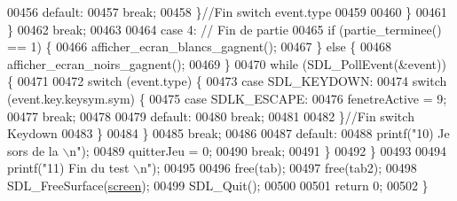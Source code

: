 \begin{DoxyCode}
00456                                         \textcolor{keywordflow}{default}:
00457                                                 \textcolor{keywordflow}{break};
00458                                         \}\textcolor{comment}{//Fin switch event.type}
00459 
00460                                 \}
00461                         \}
00462                         \textcolor{keywordflow}{break};
00463 
00464                 \textcolor{keywordflow}{case} 4: \textcolor{comment}{// Fin de partie}
00465                         \textcolor{keywordflow}{if} (partie\_terminee() == 1) \{
00466                                 afficher\_ecran\_blancs\_gagnent();
00467                         \} \textcolor{keywordflow}{else} \{
00468                                 afficher\_ecran\_noirs\_gagnent();
00469                         \}
00470                         \textcolor{keywordflow}{while} (SDL\_PollEvent(&event)) \{
00471 
00472                                 \textcolor{keywordflow}{switch} (event.type) \{
00473                                 \textcolor{keywordflow}{case} SDL\_KEYDOWN:
00474                                         \textcolor{keywordflow}{switch} (event.key.keysym.sym) \{
00475                                         \textcolor{keywordflow}{case} SDLK\_ESCAPE:
00476                                                 fenetreActive = 9;
00477                                                 \textcolor{keywordflow}{break};
00478 
00479                                         \textcolor{keywordflow}{default}:
00480                                                 \textcolor{keywordflow}{break};
00481 
00482                                         \}\textcolor{comment}{//Fin switch Keydown}
00483                                 \}
00484                         \}
00485                         \textcolor{keywordflow}{break};
00486 
00487                 \textcolor{keywordflow}{default}:
00488                         printf(\textcolor{stringliteral}{"10) Je sors de la \(\backslash\)n"});
00489                         quitterJeu = 0;
00490                         \textcolor{keywordflow}{break};
00491                 \}
00492         \}
00493 
00494         printf(\textcolor{stringliteral}{"11) Fin du test \(\backslash\)n"});
00495 
00496         free(tab);
00497         free(tab2);
00498         SDL\_FreeSurface(\hyperlink{fonction_interface_8h_a78fa3957d73de49cb81d047857504218}{screen});
00499         SDL\_Quit();
00500 
00501         \textcolor{keywordflow}{return} 0;
00502 \}
\end{DoxyCode}
